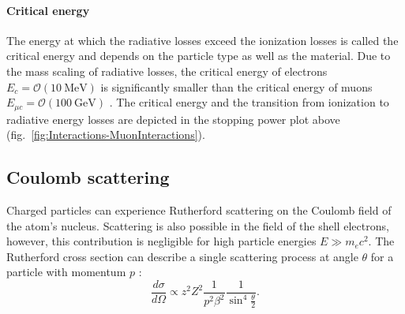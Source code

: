 \paragraph{Critical energy}
The energy at which the radiative losses exceed the ionization losses is called the critical energy and depends on the particle type as well as the material. Due to the mass scaling of radiative losses, the critical energy of electrons $E_c=\mathcal{O}(\SI{10}{\mega\electronvolt})$ is significantly smaller than the critical energy of muons $E_{\mu c}=\mathcal{O}(\SI{100}{\giga\electronvolt})$ \cite{Book-KolanoskiWermes}. The critical energy and the transition from ionization to radiative energy losses are depicted in the stopping power plot above (fig.\ \ref{fig:Interactions-MuonInteractions}).

\subsection{Coulomb scattering}
\label{sec:Interactions-CoulombScattering}
Charged particles can experience Rutherford scattering on the Coulomb field of the atom's nucleus. Scattering is also possible in the field of the shell electrons, however, this contribution is negligible for high particle energies $E\gg m_e c^2$. The Rutherford cross section can describe a single scattering process at angle $\theta$ for a particle with momentum $p$ \cite{Book-KolanoskiWermes}:
\begin{equation*}
    \frac{d\sigma}{d\Omega} \propto z^2 Z^2 \frac{1}{p^2 \beta^2} \frac{1}{\sin^4\frac{\theta}{2}}.
\end{equation*}
